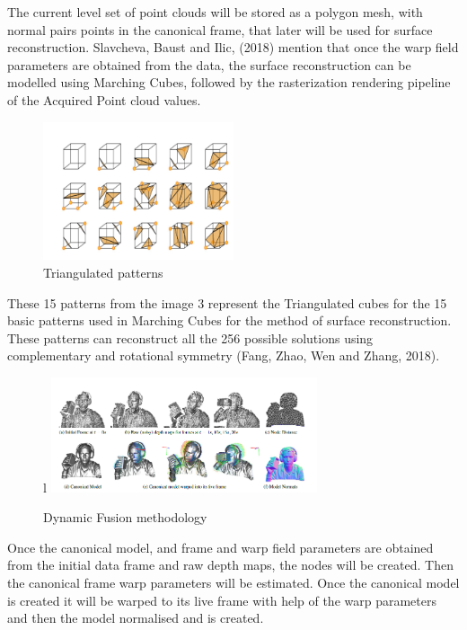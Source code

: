 \documentclass[12pt]{report}
\begin{document}
The current level set of point clouds will be stored as a polygon mesh, with normal pairs points in the canonical frame, that later will be used for surface reconstruction.   
Slavcheva, Baust and Ilic, (2018)  mention that once the warp field parameters are obtained from the data, the surface reconstruction can be modelled using Marching Cubes, followed by the rasterization rendering pipeline of the Acquired Point cloud values.\\
\begin{figure} %
    \centering
    \includegraphics[width=0.5\textwidth]{shapes.png}
    \caption{Triangulated patterns \cite[]{fang_zhao_wen_zhang_2018}}
\end{figure}
These 15 patterns from the image 3 represent the Triangulated cubes for the 15 basic patterns used in Marching Cubes for the method of surface reconstruction. These patterns can reconstruct all the 256 possible solutions using complementary and rotational symmetry (Fang, Zhao, Wen and Zhang, 2018).
\begin{figure}{l} %
    \centering
    \includegraphics[width=0.7\textwidth]{dynamicfusion2.png}
    \caption{Dynamic Fusion methodology \cite[]{newcombe_fox_seitz_2015}}
\end{figure}
Once the canonical model, and frame and warp field parameters are obtained from the initial data frame and raw depth maps, the nodes will be created. Then the canonical frame warp parameters will be estimated. Once the canonical model is created it will be warped to its live frame with help of the warp parameters and then the model normalised and is created. \\
\enlargethispage{\baselineskip}











 \nocite{*}   %

\end{document}
